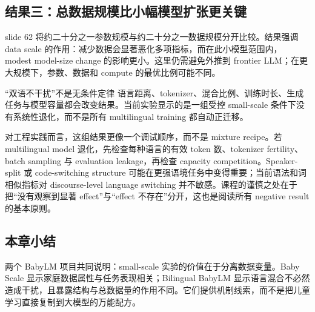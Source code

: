 

\subsection{结果三：总数据规模比小幅模型扩张更关键}

slide 62 将约二十分之一参数规模与约二十分之一数据规模分开比较。结果强调 data scale 的作用：减少数据会显著恶化多项指标，而在此小模型范围内， modest model-size change 的影响更小。这里仍需避免外推到 frontier LLM；在更大规模下，参数、数据和 compute 的最优比例可能不同。







\begin{warningbox}{“双语不干扰”不是无条件定律}
语言距离、tokenizer、混合比例、训练时长、生成任务与模型容量都会改变结果。当前实验显示的是一组受控 small-scale 条件下没有系统性退化，而不是所有 multilingual training 都自动正迁移。
\end{warningbox}

对工程实践而言，这组结果更像一个调试顺序，而不是 mixture recipe。若 multilingual model 退化，先检查每种语言的有效 token 数、tokenizer fertility、batch sampling 与 evaluation leakage，再检查 capacity competition。Speaker-split 或 code-switching structure 可能在更强语境任务中变得重要；当前语法和词相似指标对 discourse-level language switching 并不敏感。课程的谨慎之处在于把“没有观察到显著 effect”与“effect 不存在”分开，这也是阅读所有 negative result 的基本原则。

\subsection{本章小结}

两个 BabyLM 项目共同说明：small-scale 实验的价值在于分离数据变量。Baby Scale 显示家庭数据属性与任务表现相关；Bilingual BabyLM 显示语言混合不必然造成干扰，且暴露结构与总数据量的作用不同。它们提供机制线索，而不是把儿童学习直接复制到大模型的万能配方。

